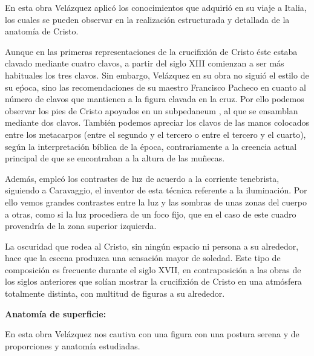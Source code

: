 En esta obra Velázquez aplicó los conocimientos que adquirió en su viaje a Italia, los cuales se pueden observar en la realización estructurada y detallada de la anatomía de Cristo.

Aunque en las primeras representaciones de la crucifixión de Cristo éste estaba clavado mediante cuatro clavos, a partir del siglo XIII comienzan a ser más habituales los tres clavos.\cite{RefWorks:36} Sin embargo, Velázquez en su obra no siguió el estilo de su eṕoca, sino las recomendaciones de su maestro Francisco Pacheco en cuanto al número de clavos que mantienen a la figura clavada en la cruz.\cite{RefWorks:45} Por ello podemos observar los pies de Cristo apoyados en un subpedaneum%
, al que se ensamblan mediante dos clavos. También podemos apreciar los clavos de las manos colocados entre los metacarpos (entre el segundo y el tercero o entre el tercero y el cuarto), según la interpretación bíblica de la época, contrariamente a la creencia actual principal de que se encontraban a la altura de las muñecas.

Además, empleó los contrastes de luz de acuerdo a la corriente tenebrista, siguiendo a Caravaggio, el inventor de esta técnica referente a la iluminación. Por ello vemos grandes contrastes entre la luz y las sombras de unas zonas del cuerpo a otras, como si la luz procediera de un foco fijo, que en el caso de este cuadro provendría de la zona superior izquierda.

La oscuridad que rodea al Cristo, sin ningún espacio ni persona a su alrededor, hace que la escena produzca una sensación mayor de soledad. Este tipo de composición es frecuente durante el siglo XVII, en contraposición a las obras de los siglos anteriores que solían mostrar la crucifixión de Cristo en una atmósfera totalmente distinta, con multitud de figuras a su alrededor.\cite{RefWorks:18}

\vspace{12pt}
\textbf{Anatomía de superficie:}

En esta obra Velázquez nos cautiva con una figura con una postura serena y de proporciones y anatomía estudiadas. %

